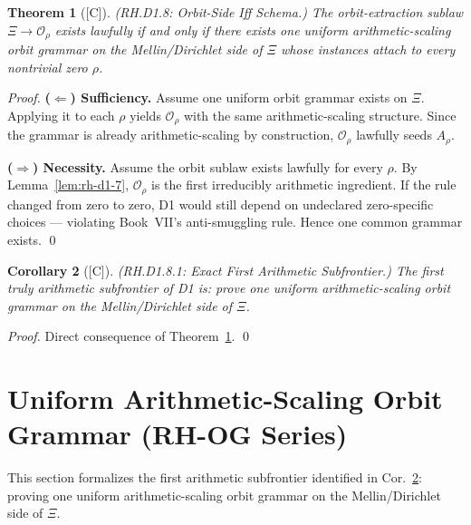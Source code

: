 \documentclass[12pt,oneside]{amsbook}
\theoremstyle{plain}
\newtheorem{theorem}{Theorem}[section]
\newtheorem{corollary}[theorem]{Corollary}
\theoremstyle{definition}
\theoremstyle{remark}
\newcommand{\status}[1]{\textup{[#1]}}
\begin{document}
\begin{theorem}[\status{C}]\label{thm:rh-d1-8}
\textup{(RH.D1.8: Orbit-Side Iff Schema.)}
The orbit-extraction sublaw $\Xi \to \mathcal{O}_\rho$ exists
lawfully if and only if there exists one uniform arithmetic-scaling
orbit grammar on the Mellin/Dirichlet side of $\Xi$ whose instances
attach to every nontrivial zero $\rho$.
\end{theorem}

\begin{proof}
\textbf{($\Leftarrow$) Sufficiency.}
Assume one uniform orbit grammar exists on $\Xi$. Applying it to
each $\rho$ yields $\mathcal{O}_\rho$ with the same arithmetic-scaling
structure. Since the grammar is already arithmetic-scaling by
construction, $\mathcal{O}_\rho$ lawfully seeds $A_\rho$.

\textbf{($\Rightarrow$) Necessity.}
Assume the orbit sublaw exists lawfully for every $\rho$. By
Lemma~\ref{lem:rh-d1-7}, $\mathcal{O}_\rho$ is the first irreducibly
arithmetic ingredient. If the rule changed from zero to zero, D1
would still depend on undeclared zero-specific choices --- violating
Book~VII's anti-smuggling rule. Hence one common grammar exists. \qed
\end{proof}

\begin{corollary}[\status{C}]\label{cor:rh-d1-8-1}
\textup{(RH.D1.8.1: Exact First Arithmetic Subfrontier.)}
The first truly arithmetic subfrontier of D1 is: prove one uniform
arithmetic-scaling orbit grammar on the Mellin/Dirichlet side of $\Xi$.
\end{corollary}

\begin{proof}
Direct consequence of Theorem~\ref{thm:rh-d1-8}. \qed
\end{proof}

\section{Uniform Arithmetic-Scaling Orbit Grammar (RH-OG Series)}
\label{sec:rh-og}

This section formalizes the first arithmetic subfrontier identified in
Cor.~\ref{cor:rh-d1-8-1}: proving one uniform arithmetic-scaling orbit
grammar on the Mellin/Dirichlet side of $\Xi$.
\end{document}
